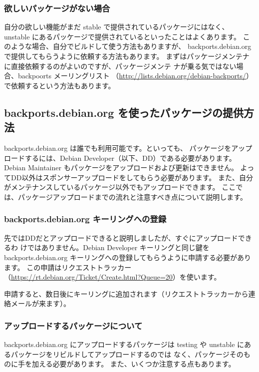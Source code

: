\documentclass[mingoth,a4paper]{jsarticle}
\begin{document}
\subsubsection{欲しいパッケージがない場合}
自分の欲しい機能がまだ stable で提供されているパッケージにはなく、
unstable にあるパッケージで提供されているといったことはよくあります。
このような場合、自分でビルドして使う方法もありますが、
backports.debian.org で提供してもらうように依頼する方法もあります。
まずはパッケージメンテナに直接依頼するのがよいのですが、パッケージメンテ
ナが乗る気ではない場合、backpoorts メーリングリスト
（\url{http://lists.debian.org/debian-backports/}）で依頼するという方法もあります。


\subsection{backports.debian.org を使ったパッケージの提供方法}

backports.debian.org は誰でも利用可能です。といっても、
パッケージをアップロードするには、Debian Developer（以下、DD）である必要があります。
Debian Maintainer もパッケージをアップロードおよび更新はできません。
よってDD以外はスポンサーアップロードをしてもらう必要があります。
また、自分がメンテナンスしているパッケージ以外でもアップロードできます。
ここでは、パッケージアップロードまでの流れと注意すべき点について説明します。

\subsubsection{backports.debian.org キーリングへの登録}
先ではDDだとアップロードできると説明しましたが、すぐにアップロードできるわ
けではありません。Debian Developer キーリングと同じ鍵を
backports.debian.org キーリングへの登録してもらうように申請する必要があります。
この申請はリクエストトラッカー
（\url{https://rt.debian.org/Ticket/Create.html?Queue=20}）を使います。

申請すると、数日後にキーリングに追加されます（リクエストトラッカーから連
絡メールが来ます）。

\subsubsection{アップロードするパッケージについて}

backports.debian.org にアップロードするパッケージは
 testing や unstable にあるパッケージをリビルドしてアップロードするのでは
なく、パッケージそのものに手を加える必要があります。
また、いくつか注意する点もあります。
\end{document}
